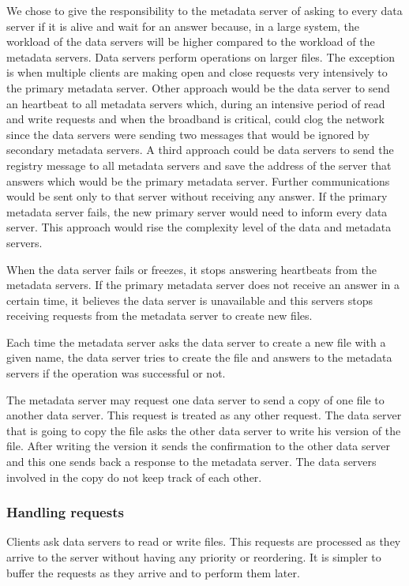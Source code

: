 We chose to give the responsibility to the metadata server of asking to
every data server if it is alive and wait for an answer because, in a large
system, the workload of the data servers will be higher compared to the
workload of the metadata servers. Data servers perform operations on larger
files. The exception is when multiple clients are making open and close
requests very intensively to the primary metadata server. Other approach
would be the data server to send an heartbeat to all metadata servers which,
during an intensive period of read and write requests and when the broadband
is critical, could clog the network since the data servers were sending two
messages that would be ignored by secondary metadata servers.
A third approach could be data servers to send the registry message to all
metadata servers and save the address of the server that answers which 
would be the primary metadata server. Further communications would be sent 
only to that server without receiving any answer. If the primary
metadata server fails, the new primary server would need to inform every data
server. This approach would rise the complexity level of the data and
metadata servers.

When the data server fails or freezes, it stops answering heartbeats from
the metadata servers. If the primary metadata server does not receive an
answer in a certain time, it believes the data server is unavailable
and this servers stops receiving requests from the metadata server to
create new files.

Each time the metadata server asks the data server to create a new file
with a given name, the data server tries to create the file and answers
to the metadata servers if the operation was successful or not.

The metadata server may request one data server to send a copy of one file
to another data server. This request is treated as any other request.
The data server that is going to copy the file asks the other data server
to write his version of the file. After writing the version it sends the 
confirmation to the other data server and this one sends back a response 
to the metadata server.
The data servers involved in the copy do not keep track of each other.

\subsubsection{Handling requests}

Clients ask data servers to read or write files. This requests are
processed as they arrive to the server without having any priority or 
reordering. It is simpler to buffer the requests as they arrive and to
perform them later.

